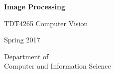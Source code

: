 \documentclass[pdftex,12pt,a4paper,twoside]{report}
\begin{document}
\thispagestyle{empty}

\begin{center}
    {\Huge\textbf{Image Processing}} \\
    \medskip

    \vspace{1.5cm}

    {\Large TDT4265 Computer Vision}\\

    \vspace{0.6cm}

    {\large Spring 2017}\\

    \vspace{15cm}

    \large{Department of\\Computer and Information Science}

\end{center}

\newpage


\setcounter{tocdepth}{4}
\setcounter{secnumdepth}{4}

\tableofcontents
\clearpage





\appendix



\clearpage
{}


\end{document}
